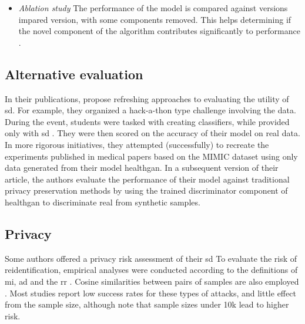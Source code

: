 \begin{itemize}
\begin{itemize}
                    \item \textsl{Ablation study}  The performance of the model is compared against versions impared version, with some components removed. This helps determining if the novel component of the algorithm contributes significantly to performance \cite{cui2019conan, Che_2017, mcdermott2018semi, Yoon2018-radial, chincheong2020generation}.
                \end{itemize}
            \end{itemize}
            
                
                
                

    \subsection{Alternative evaluation}
        In their publications, \citeauthor{Yale_2020} propose refreshing approaches to evaluating the utility of \gls{sd}. For example, they organized a hack-a-thon type challenge involving the data. During the event, students were tasked with creating classifiers, while provided only with \gls{sd} \cite{Yale_2020}. They were then scored on the accuracy of their model on real data. In more rigorous initiatives, they attempted (successfully) to recreate the experiments published in medical papers based on the MIMIC dataset using only data generated from their model \gls{healthgan}. In a subsequent version of their article, the authors evaluate the performance of their model against traditional privacy preservation methods by using the trained discriminator component of \gls{healthgan} to discriminate real from synthetic samples.
        
    \subsection{Privacy}
        Some authors offered a privacy risk assessment of their \gls{sd} To evaluate the risk of reidentification, empirical analyses were conducted according to the definitions of \gls{mi}, \gls{ad}  \cite{Choi2017-nt,Goncalves2020,yan2020generating,chen2019ganleaks, chincheong2020generation} and the \gls{rr} \cite{Zhang2020}. Cosine similarities between pairs of samples are also employed \cite{torfi2019generating}. Most studies report low success rates for these types of attacks, and little effect from the sample size, although \citeauthor{chen2019ganleaks} note that sample sizes under 10k lead to higher risk. \par
        
